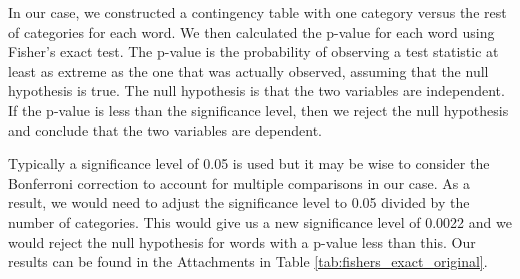 In our case, we constructed a contingency table with one category versus the rest of categories for each word. We then calculated the p-value for each word using Fisher's exact test. The p-value is the probability of observing a test statistic at least as extreme as the one that was actually observed, assuming that the null hypothesis is true. The null hypothesis is that the two variables are independent. If the p-value is less than the significance level, then we reject the null hypothesis and conclude that the two variables are dependent. 

Typically a significance level of 0.05 is used but it may be wise to consider the Bonferroni correction to account for multiple comparisons in our case. As a result, we would need to adjust the significance level to 0.05 divided by the number of categories. This would give us a new significance level of 0.0022 and we would reject the null hypothesis for words with a p-value less than this. Our results can be found in the Attachments in Table \ref{tab:fishers_exact_original}.